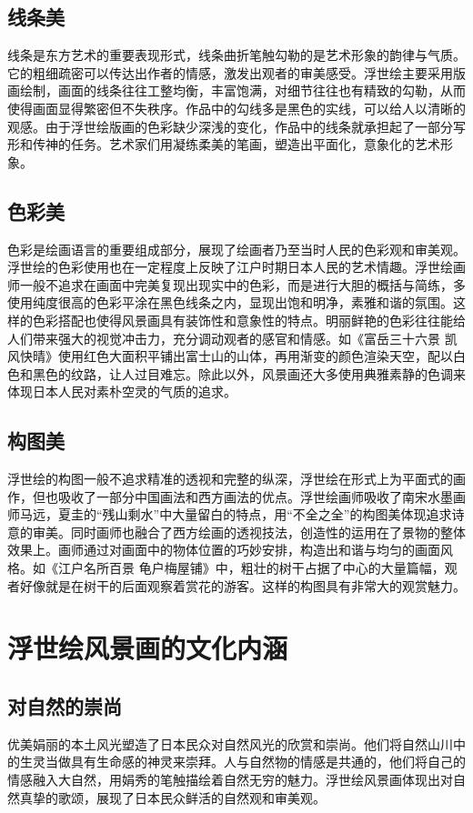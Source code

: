 \documentclass{ctexart}
\begin{document}
\subsection{线条美}
线条是东方艺术的重要表现形式，线条曲折笔触勾勒的是艺术形象的韵律与气质。它的粗细疏密可以传达出作者的情感，激发出观者的审美感受。浮世绘主要采用版画绘制，画面的线条往往工整均衡，丰富饱满，对细节往往也有精致的勾勒，从而使得画面显得繁密但不失秩序。作品中的勾线多是黑色的实线，可以给人以清晰的观感。由于浮世绘版画的色彩缺少深浅的变化，作品中的线条就承担起了一部分写形和传神的任务。艺术家们用凝练柔美的笔画，塑造出平面化，意象化的艺术形象。
\subsection{色彩美}
色彩是绘画语言的重要组成部分，展现了绘画者乃至当时人民的色彩观和审美观。浮世绘的色彩使用也在一定程度上反映了江户时期日本人民的艺术情趣。浮世绘画师一般不追求在画面中完美复现出现实中的色彩，而是进行大胆的概括与简练，多使用纯度很高的色彩平涂在黑色线条之内，显现出饱和明净，素雅和谐的氛围。这样的色彩搭配也使得风景画具有装饰性和意象性的特点。明丽鲜艳的色彩往往能给人们带来强大的视觉冲击力，充分调动观者的感官和情感。如《富岳三十六景 凯风快晴》使用红色大面积平铺出富士山的山体，再用渐变的颜色渲染天空，配以白色和黑色的纹路，让人过目难忘。除此以外，风景画还大多使用典雅素静的色调来体现日本人民对素朴空灵的气质的追求。
\subsection{构图美}
浮世绘的构图一般不追求精准的透视和完整的纵深，浮世绘在形式上为平面式的画作，但也吸收了一部分中国画法和西方画法的优点。浮世绘画师吸收了南宋水墨画师马远，夏圭的“残山剩水”中大量留白的特点，用“不全之全”的构图美体现追求诗意的审美。同时画师也融合了西方绘画的透视技法，创造性的运用在了景物的整体效果上。画师通过对画面中的物体位置的巧妙安排，构造出和谐与均匀的画面风格。如《江户名所百景 龟户梅屋铺》中，粗壮的树干占据了中心的大量篇幅，观者好像就是在树干的后面观察着赏花的游客。这样的构图具有非常大的观赏魅力。
\section{浮世绘风景画的文化内涵}
\subsection{对自然的崇尚}
优美娟丽的本土风光塑造了日本民众对自然风光的欣赏和崇尚。他们将自然山川中的生灵当做具有生命感的神灵来崇拜。人与自然物的情感是共通的，他们将自己的情感融入大自然，用娟秀的笔触描绘着自然无穷的魅力。浮世绘风景画体现出对自然真挚的歌颂，展现了日本民众鲜活的自然观和审美观。
\end{document}
